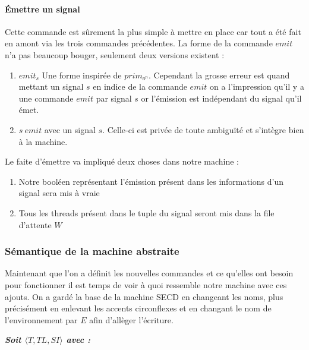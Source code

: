 \documentclass[10pt,a4paper]{article}
\begin{document}
						
						
						
				\paragraph{Émettre un signal}
						
					Cette commande est sûrement la plus simple à mettre en place car tout a été fait en amont via les trois commandes précédentes. La forme de la commande $emit$ n'a pas beaucoup bouger, seulement deux versions existent :
					\begin{enumerate}
						\item $emit_{s}$ Une forme inspirée de $prim_{o^{n}}$. Cependant la grosse erreur est quand mettant un signal $s$ en indice de la commande $emit$ on a l'impression qu'il y a une commande $emit$ par signal $s$ or l'émission est indépendant du signal qu'il émet.
						\item $s~emit$ avec un signal $s$. Celle-ci est privée de toute ambiguïté et s'intègre bien à la machine. 
					\end{enumerate}
					\medbreak
						
					Le faite d'émettre va impliqué deux choses dans notre machine :
					\begin{enumerate}					
						\item Notre booléen représentant l'émission présent dans les informations d'un signal sera mis à vraie
						\item Tous les threads présent dans le tuple du signal seront mis dans la file d'attente $W$ 
					\end{enumerate} 
					\bigbreak
					\bigbreak
				
				
					
					
			\subsubsection{Sémantique de la machine abstraite}
				
				Maintenant que l'on a définit les nouvelles commandes et ce qu'elles ont besoin pour fonctionner il est temps de voir à quoi ressemble notre machine avec ces ajouts. On a gardé la base de la machine SECD en changeant les noms, plus précisément en enlevant les accents circonflexes et en changant le nom de l'environnement par $E$ afin d'allèger l'écriture.
				\bigbreak
					
					
				\textbf{\textit{Soit $\langle T,TL,SI\rangle$ avec :}}
					
\end{document}
